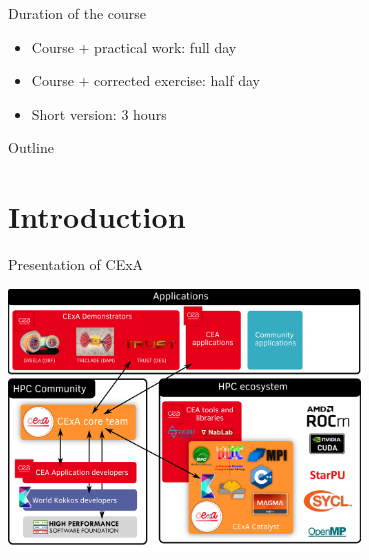 \documentclass[aspectratio=169]{beamer}
\begin{document}

\begin{frame}{Duration of the course}
    \begin{itemize}
        \item Course + practical work: full day
        \item Course + corrected exercise: half day
        \item Short version: 3 hours
    \end{itemize}
\end{frame}

\begin{frame}{Outline}
    \tableofcontents[hidesubsections]
\end{frame}


\section{Introduction}


\begin{frame}{Presentation of CExA}
    \begin{center}
        \includegraphics[width=0.7\textwidth]{cexa.png}
    \end{center}
\end{frame}

\end{document}
